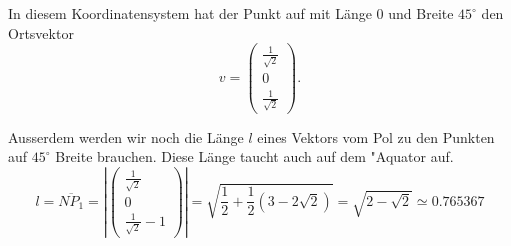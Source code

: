 \begin{loesung}
In diesem Koordinatensystem hat der Punkt auf mit Länge 0
und Breite $45^\circ$ den Ortsvektor
\[
v=
\begin{pmatrix}
\frac1{\sqrt{2}}\\0\\\frac1{\sqrt{2}}
\end{pmatrix}.
\]

Ausserdem werden wir noch die Länge $l$ eines Vektors vom Pol zu den Punkten
auf $45^\circ$ Breite brauchen. Diese Länge taucht auch auf dem "Aquator
auf. 
\[
l
=
\overline{NP_1}
=
\left|
\begin{pmatrix}
\frac1{\sqrt{2}}\\0\\\frac1{\sqrt{2}}-1
\end{pmatrix}
\right|
=
\sqrt{\frac12 +\frac12(3-2\sqrt{2})}=\sqrt{2-\sqrt{2}}
\simeq
0.765367
\]


\end{loesung}
